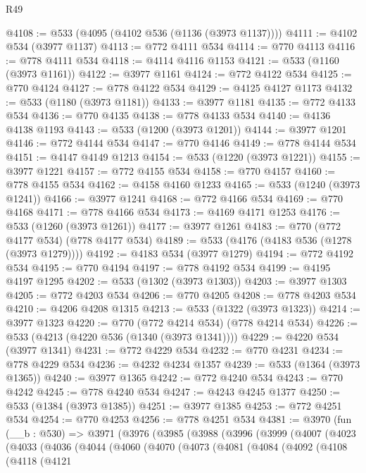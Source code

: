\begin{lexlean}{R49}
\begin{coremodule}
@4108 := @533 (@4095 (@4102 @536 (@1136 (@3973 @1137))))
@4111 := @4102 @534 (@3977 @1137)
@4113 := @772 @4111 @534
@4114 := @770 @4113
@4116 := @778 @4111 @534
@4118 := @4114 @4116 @1153
@4121 := @533 (@1160 (@3973 @1161))
@4122 := @3977 @1161
@4124 := @772 @4122 @534
@4125 := @770 @4124
@4127 := @778 @4122 @534
@4129 := @4125 @4127 @1173
@4132 := @533 (@1180 (@3973 @1181))
@4133 := @3977 @1181
@4135 := @772 @4133 @534
@4136 := @770 @4135
@4138 := @778 @4133 @534
@4140 := @4136 @4138 @1193
@4143 := @533 (@1200 (@3973 @1201))
@4144 := @3977 @1201
@4146 := @772 @4144 @534
@4147 := @770 @4146
@4149 := @778 @4144 @534
@4151 := @4147 @4149 @1213
@4154 := @533 (@1220 (@3973 @1221))
@4155 := @3977 @1221
@4157 := @772 @4155 @534
@4158 := @770 @4157
@4160 := @778 @4155 @534
@4162 := @4158 @4160 @1233
@4165 := @533 (@1240 (@3973 @1241))
@4166 := @3977 @1241
@4168 := @772 @4166 @534
@4169 := @770 @4168
@4171 := @778 @4166 @534
@4173 := @4169 @4171 @1253
@4176 := @533 (@1260 (@3973 @1261))
@4177 := @3977 @1261
@4183 := @770 (@772 @4177 @534) (@778 @4177 @534)
@4189 := @533 (@4176 (@4183 @536 (@1278 (@3973 @1279))))
@4192 := @4183 @534 (@3977 @1279)
@4194 := @772 @4192 @534
@4195 := @770 @4194
@4197 := @778 @4192 @534
@4199 := @4195 @4197 @1295
@4202 := @533 (@1302 (@3973 @1303))
@4203 := @3977 @1303
@4205 := @772 @4203 @534
@4206 := @770 @4205
@4208 := @778 @4203 @534
@4210 := @4206 @4208 @1315
@4213 := @533 (@1322 (@3973 @1323))
@4214 := @3977 @1323
@4220 := @770 (@772 @4214 @534) (@778 @4214 @534)
@4226 := @533 (@4213 (@4220 @536 (@1340 (@3973 @1341))))
@4229 := @4220 @534 (@3977 @1341)
@4231 := @772 @4229 @534
@4232 := @770 @4231
@4234 := @778 @4229 @534
@4236 := @4232 @4234 @1357
@4239 := @533 (@1364 (@3973 @1365))
@4240 := @3977 @1365
@4242 := @772 @4240 @534
@4243 := @770 @4242
@4245 := @778 @4240 @534
@4247 := @4243 @4245 @1377
@4250 := @533 (@1384 (@3973 @1385))
@4251 := @3977 @1385
@4253 := @772 @4251 @534
@4254 := @770 @4253
@4256 := @778 @4251 @534
@4381 := @3970
    (fun (__b : @530) =>
    @3971
      (@3976
        (@3985
          (@3988
            (@3996
              (@3999
                (@4007
                  (@4023
                    (@4033
                      (@4036
                        (@4044
                          (@4060
                            (@4070
                              (@4073
                                (@4081
                                  (@4084
                                    (@4092
                                      (@4108
                                        (@4118
                                          (@4121

\end{coremodule}
\end{lexlean}
